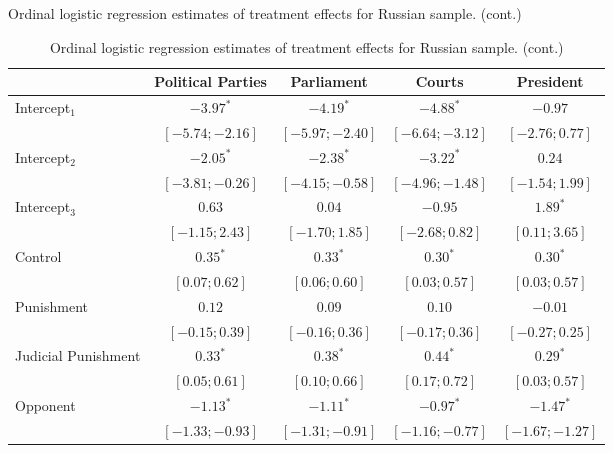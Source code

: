 \begin{table}[h]
\begin{center}
\caption
*
{Ordinal logistic regression estimates of treatment effects for Russian sample. (cont.)}
\caption{Ordinal logistic regression estimates of treatment effects for Russian sample. (cont.)}
\begin{threeparttable}
\begin{tabular}{l c c c c}
\hline
 & Political Parties & Parliament & Courts & President \\
\hline
Intercept$_1$            & $-3.97^{*}$       & $-4.19^{*}$       & $-4.88^{*}$       & $-0.97$           \\
                         & $ [-5.74; -2.16]$ & $ [-5.97; -2.40]$ & $ [-6.64; -3.12]$ & $ [-2.76;  0.77]$ \\
Intercept$_2$            & $-2.05^{*}$       & $-2.38^{*}$       & $-3.22^{*}$       & $0.24$            \\
                         & $ [-3.81; -0.26]$ & $ [-4.15; -0.58]$ & $ [-4.96; -1.48]$ & $ [-1.54;  1.99]$ \\
Intercept$_3$            & $0.63$            & $0.04$            & $-0.95$           & $1.89^{*}$        \\
                         & $ [-1.15;  2.43]$ & $ [-1.70;  1.85]$ & $ [-2.68;  0.82]$ & $ [ 0.11;  3.65]$ \\
Control                  & $0.35^{*}$        & $0.33^{*}$        & $0.30^{*}$        & $0.30^{*}$        \\
                         & $ [ 0.07;  0.62]$ & $ [ 0.06;  0.60]$ & $ [ 0.03;  0.57]$ & $ [ 0.03;  0.57]$ \\
Punishment               & $0.12$            & $0.09$            & $0.10$            & $-0.01$           \\
                         & $ [-0.15;  0.39]$ & $ [-0.16;  0.36]$ & $ [-0.17;  0.36]$ & $ [-0.27;  0.25]$ \\
Judicial Punishment      & $0.33^{*}$        & $0.38^{*}$        & $0.44^{*}$        & $0.29^{*}$        \\
                         & $ [ 0.05;  0.61]$ & $ [ 0.10;  0.66]$ & $ [ 0.17;  0.72]$ & $ [ 0.03;  0.57]$ \\
Opponent                 & $-1.13^{*}$       & $-1.11^{*}$       & $-0.97^{*}$       & $-1.47^{*}$       \\
                         & $ [-1.33; -0.93]$ & $ [-1.31; -0.91]$ & $ [-1.16; -0.77]$ & $ [-1.67; -1.27]$ \\

\end{tabular}
\end{threeparttable}
\end{center}
\end{table}
